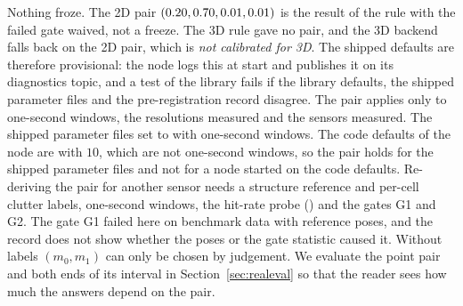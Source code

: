 Nothing froze. The 2D pair $(0.20,0.70,0.01,0.01)$ is the result of the rule with the failed gate waived, not a freeze. The 3D rule gave no pair, and the 3D backend falls back on the 2D pair, which is \emph{not calibrated for 3D}. The shipped defaults are therefore provisional: the node logs this at start and publishes it on its diagnostics topic, and a test of the library fails if the library defaults, the shipped parameter files and the pre-registration record disagree. The pair applies only to one-second windows, the resolutions measured and the sensors measured. The shipped parameter files set  to  with one-second windows. The code defaults of the node are   with  $10$, which are not one-second windows, so the pair holds for the shipped parameter files and not for a node started on the code defaults. Re-deriving the pair for another sensor needs a structure reference and per-cell clutter labels, one-second windows, the hit-rate probe () and the gates G1 and G2. The gate G1 failed here on benchmark data with reference poses, and the record does not show whether the poses or the gate statistic caused it. Without labels $(m_0,m_1)$ can only be chosen by judgement. We evaluate the point pair and both ends of its interval in Section~\ref{sec:realeval} so that the reader sees how much the answers depend on the pair.
